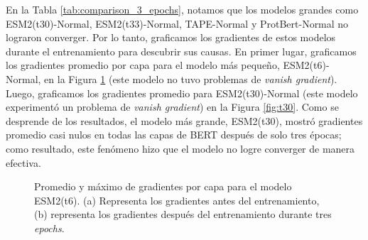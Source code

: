 En la Tabla \ref{tab:comparison_3_epochs}, notamos que los modelos grandes como ESM2(t30)-Normal, ESM2(t33)-Normal, TAPE-Normal y ProtBert-Normal no lograron converger. Por lo tanto, graficamos los gradientes de estos modelos durante el entrenamiento para descubrir sus causas. En primer lugar, graficamos los gradientes promedio por capa para el modelo más pequeño, ESM2(t6)-Normal, en la Figura \ref{fig:t6} (este modelo no tuvo problemas de \textit{vanish gradient}). Luego, graficamos los gradientes promedio para ESM2(t30)-Normal (este modelo experimentó un problema de \textit{vanish gradient}) en la Figura \ref{fig:t30}. Como se desprende de los resultados, el modelo más grande, ESM2(t30), mostró gradientes promedio casi nulos en todas las capas de BERT después de solo tres épocas; como resultado, este fenómeno hizo que el modelo no logre converger de manera efectiva.

\begin{figure}[h]
	\centering
	

	\caption[Gradientes del modelo ESM2(t6)]{Promedio y máximo de gradientes por capa para el modelo ESM2(t6). (a) Representa los gradientes antes del entrenamiento, (b) representa los gradientes después del entrenamiento durante tres \textit{epochs}.}
	\label{fig:t6}
\end{figure}

